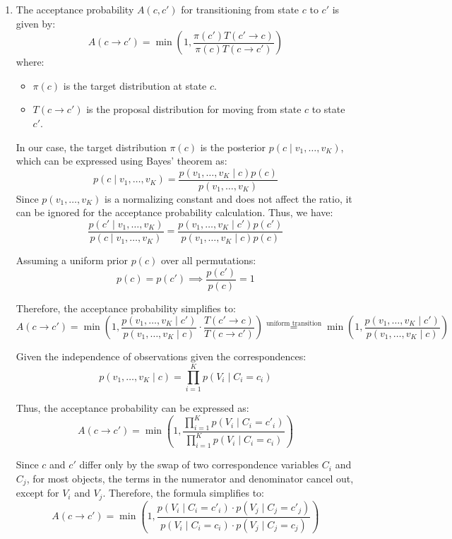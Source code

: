\documentclass[a4 paper]{article}
\begin{document}
\begin{enumerate}
    \item {}
    
    The acceptance probability \( A(c, c') \) for transitioning from state \( c \) to \( c' \) is given by:
    \[
    A(c \to c') = \min \left( 1, \frac{\pi(c') T(c' \to c)}{\pi(c) T(c \to c')} \right)
    \]
    where:
    \begin{itemize}
        \item \( \pi(c) \) is the target distribution at state \( c \).
        \item \( T(c \to c') \) is the proposal distribution for moving from state \( c \) to state \( c' \).
    \end{itemize}

    In our case, the target distribution \( \pi(c) \) is the posterior \( p(c \mid v_1, \ldots, v_K) \), which can be expressed using Bayes' theorem as:
    \[
    p(c \mid v_1, \ldots, v_K) = \frac{p(v_1, \ldots, v_K \mid c) p(c)}{p(v_1, \ldots, v_K)}
    \]
    Since \( p(v_1, \ldots, v_K) \) is a normalizing constant and does not affect the ratio, it can be ignored for the acceptance probability calculation. Thus, we have:
    \[
    \frac{p(c' \mid v_1, \ldots, v_K)}{p(c \mid v_1, \ldots, v_K)} = \frac{p(v_1, \ldots, v_K \mid c') p(c')}{p(v_1, \ldots, v_K \mid c) p(c)}
    \]

    Assuming a uniform prior \( p(c) \) over all permutations:
    \[
    p(c) = p(c') \implies \frac{p(c')}{p(c)} = 1
    \]

    Therefore, the acceptance probability simplifies to:
    \[
    A(c \to c') = \min \left( 1, \frac{p(v_1, \ldots, v_K \mid c')}{p(v_1, \ldots, v_K \mid c)} \cdot \frac{T(c' \to c)}{T(c \to c')} \right)
     \stackrel{\text{uniform transition}}{=} \min \left( 1, \frac{p(v_1, \ldots, v_K \mid c')}{p(v_1, \ldots, v_K \mid c)} \right)
    \]

    Given the independence of observations given the correspondences:
    \[
    p(v_1, \ldots, v_K \mid c) = \prod_{i=1}^{K} p(V_i \mid C_i = c_i)
    \]

    Thus, the acceptance probability can be expressed as:
    \[
    A(c \to c') = \min \left( 1, \frac{\prod_{i=1}^{K} p(V_i \mid C_i = c'_i)}{\prod_{i=1}^{K} p(V_i \mid C_i = c_i)} \right)
    \]

    Since \( c \) and \( c' \) differ only by the swap of two correspondence variables \( C_i \) and \( C_j \), for most objects, 
    the terms in the numerator and denominator cancel out, except for \( V_i \) and \( V_j \). Therefore, the formula simplifies to:
    \[
    A(c \to c') = \min \left( 1, \frac{p(V_i \mid C_i = c'_i) \cdot p(V_j \mid C_j = c'_j)}{p(V_i \mid C_i = c_i) \cdot p(V_j \mid C_j = c_j)} \right)
    \]


\end{enumerate}
\end{document}
